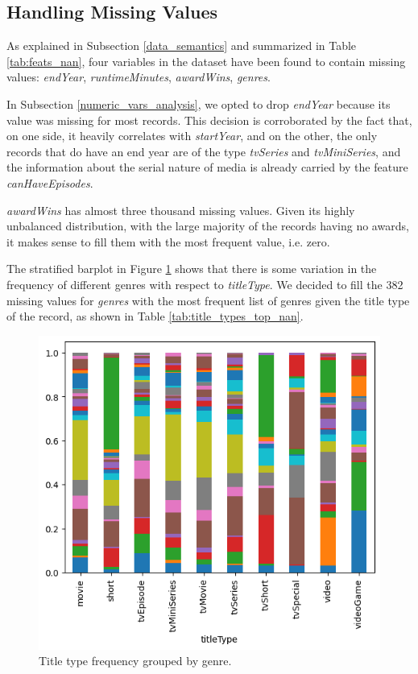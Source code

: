 \subsection{Handling Missing Values}
As explained in Subsection \ref{data_semantics} and summarized in Table \ref{tab:feats_nan}, four variables in the dataset have been found to contain missing values: \textit{endYear}, \textit{runtimeMinutes}, \textit{awardWins}, \textit{genres}.

In Subsection \ref{numeric_vars_analysis}, we opted to drop \textit{endYear} because its value was missing for most records. This decision is corroborated by the fact that, on one side, it heavily correlates with \textit{startYear}, and on the other, the only records that do have an end year are of the type \textit{tvSeries} and \textit{tvMiniSeries}, and the information about the serial nature of media is already carried by the feature \textit{canHaveEpisodes}.

\textit{awardWins} has almost three thousand missing values. Given its highly unbalanced distribution, with the large majority of the records having no awards, it makes sense to fill them with the most frequent value, i.e. zero.

The stratified barplot in Figure \ref{fig:stratified_barplot_genres_titleTypes.png} shows that there is some variation in the frequency of different genres with respect to \textit{titleType}. We decided to fill the 382 missing values for \textit{genres} with the most frequent list of genres given the title type of the record, as shown in Table \ref{tab:title_types_top_nan}.

\begin{figure}
    \includegraphics[width=\columnwidth]{../results/images/stratified_barplot_genres_titleTypes.png}
    \caption{Title type frequency grouped by genre.}
    \label{fig:stratified_barplot_genres_titleTypes.png}
\end{figure}


